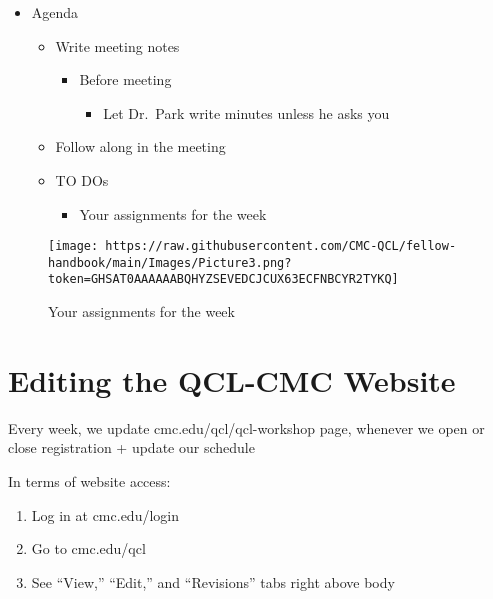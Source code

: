 \documentclass[
]{book}
\providecommand{\tightlist}{%
  \setlength{\itemsep}{0pt}\setlength{\parskip}{0pt}}
\begin{document}
\begin{itemize}
\tightlist
\item
  Agenda

  \begin{itemize}
  \tightlist
  \item
    Write meeting notes

    \begin{itemize}
    \tightlist
    \item
      Before meeting

      \begin{itemize}
      \tightlist
      \item
        Let Dr.~Park write minutes unless he asks you\\
      \end{itemize}
    \end{itemize}
  \item
    Follow along in the meeting\\
  \item
    TO DOs

    \begin{itemize}
    \tightlist
    \item
      Your assignments for the week
    \end{itemize}
  \end{itemize}
\end{itemize}

\begin{figure}
\centering
\texttt{[image: https://raw.githubusercontent.com/CMC-QCL/fellow-handbook/main/Images/Picture3.png?token=GHSAT0AAAAAABQHYZSEVEDCJCUX63ECFNBCYR2TYKQ]}
\caption{Your assignments for the week}
\end{figure}

\hypertarget{editing-the-qcl-cmc-website}{%
\chapter{Editing the QCL-CMC Website}\label{editing-the-qcl-cmc-website}}

Every week, we update cmc.edu/qcl/qcl-workshop page, whenever we open or close registration + update our schedule

In terms of website access:

\begin{enumerate}
\def\labelenumi{\arabic{enumi}.}
\tightlist
\item
  Log in at cmc.edu/login
\item
  Go to cmc.edu/qcl
\item
  See ``View,'' ``Edit,'' and ``Revisions'' tabs right above body
\end{enumerate}
\end{document}
